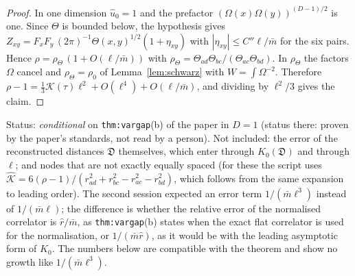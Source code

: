 \documentclass[a4paper,11pt]{article}
\theoremstyle{definition}
\theoremstyle{remark}
\newcommand{\status}[1]{\par\noindent\textsf{\small Status: #1}\par}
\begin{document}
\begin{proof}
In one dimension $\hat u_0=1$ and the prefactor $(\Omega(x)\Omega(y))^{(D-1)/2}$ is one. Since $\Theta$ is bounded below, the hypothesis gives $Z_{xy}=F_xF_y\,(2\pi)^{-1}\Theta(x,y)^{1/2}(1+\eta_{xy})$ with $|\eta_{xy}|\le C''\ell/\bar m$ for the six pairs. Hence $\rho=\rho_\Theta\,(1+O(\ell/\bar m))$ with $\rho_\Theta=\Theta_{ad}\Theta_{bc}/(\Theta_{ac}\Theta_{bd})$. In $\rho_\Theta$ the factors $\Omega$ cancel and $\rho_\Theta=\rho_0$ of Lemma~\ref{lem:schwarz} with $W=\int\Omega^{-2}$. Therefore $\rho-1=\tfrac13\mathcal K(\tau)\ell^2+O(\ell^4)+O(\ell/\bar m)$, and dividing by $\ell^2/3$ gives the claim.
\end{proof}
\status{\emph{conditional} on \texttt{thm:vargap}(b) of the paper in $D=1$ (status there: proven by the paper's standards, not read by a person). Not included: the error of the reconstructed distances $\mathfrak D$ themselves, which enter through $K_0(\mathfrak D)$ and through $\ell$; and nodes that are not exactly equally spaced (for these the script uses $\hat{\mathcal K}=6(\rho-1)/(r_{ad}^2+r_{bc}^2-r_{ac}^2-r_{bd}^2)$, which follows from the same expansion to leading order). The second session expected an error term $1/(\bar m\ell^3)$ instead of $1/(\bar m\ell)$; the difference is whether the relative error of the normalised correlator is $\hat r/\bar m$, as \texttt{thm:vargap}(b) states when the exact flat correlator is used for the normalisation, or $1/(\bar m\hat r)$, as it would be with the leading asymptotic form of $K_0$. The numbers below are compatible with the theorem and show no growth like $1/(\bar m\ell^3)$.}
\end{document}

